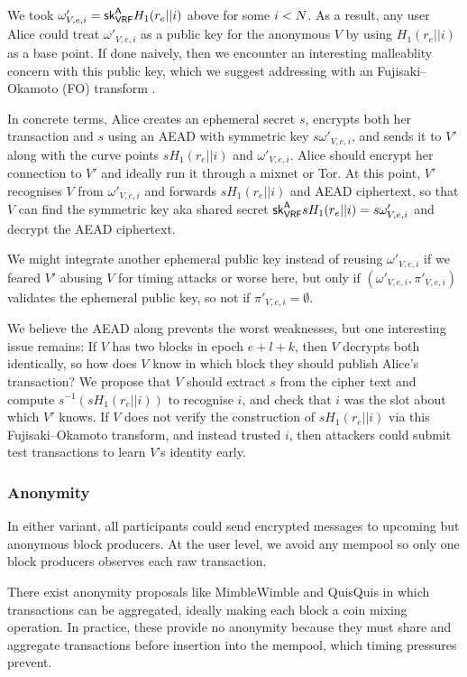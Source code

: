 We took $\omega'_{V,e,i} = \mathsf{sk}_{\mathsf{VRF}}^{\mathsf{A}} H_1(r_e || i)$ above for some $i < N$.  As a result, any user Alice could treat $\omega'_{V,e,i}$ as a public key for the anonymous $V$ by using $H_1(r_e || i)$ as a base point.  If done naively, then we encounter an interesting malleablity concern with this public key, which we suggest addressing with an Fujisaki–Okamoto (FO) transform \cite{FO_transform}.  

In concrete terms, Alice creates an ephemeral secret $s$, encrypts both her transaction and $s$ using an AEAD with symmetric key $s \omega'_{V,e,i}$, and sends it to $V'$ along with the curve points $s H_1(r_e || i)$ and $\omega'_{V,e,i}$.  Alice should encrypt her connection to $V'$ and ideally run it through a mixnet or Tor.  At this point, $V'$ recognises $V$ from $\omega'_{V,e,i}$ and forwards $s H_1(r_e || i)$ and AEAD ciphertext, so that $V$ can find the symmetric key aka shared secret $\mathsf{sk}_{\mathsf{VRF}}^{\mathsf{A}} s H_1(r_e || i) = s \omega'_{V,e,i}$ and decrypt the AEAD ciphertext.

We might integrate another ephemeral public key instead of reusing $\omega'_{V,e,i}$ if we feared $V'$ abusing $V$ for timing attacks or worse here, but only if $(\omega'_{V,e,i},\pi'_{V,e,i})$ validates the ephemeral public key, so not if $\pi'_{V,e,i} = \emptyset$.  

We believe the AEAD along prevents the worst weaknesses, but one interesting issue remains:  If $V$ has two blocks in epoch $e+l+k$, then $V$ decrypts both identically, so how does $V$ know in which block they should publish Alice's transaction?  We propose that $V$ should extract $s$ from the cipher text and compute $s^{-1} (s H_1(r_e || i))$ to recognise $i$, and check that $i$ was the slot about which $V'$ knows.  If $V$ does not verify the construction of $s H_1(r_e || i)$ via this Fujisaki–Okamoto transform, and instead trusted $i$, then attackers could submit test transactions to learn $V$'s identity early. 

\subsubsection{Anonymity}

In either variant, all participants could send encrypted messages to upcoming but anonymous block producers.  At the user level, we avoid any mempool so only one block producers observes each raw transaction.  

There exist anonymity proposals like MimbleWimble \cite{MimbleWimble} and QuisQuis \cite{QuisQuis} in which transactions can be aggregated, ideally making each block a coin mixing operation.  In practice, these provide no anonymity because they must share and aggregate transactions before insertion into the mempool, which timing pressures prevent.  

